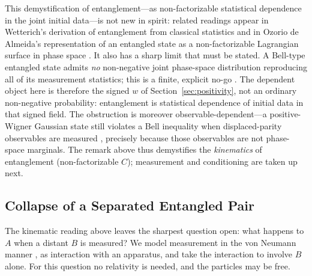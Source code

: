 \documentclass[12pt]{article}
\begin{document}
This demystification of entanglement---as non-factorizable statistical dependence in the joint initial data---is not new in spirit: related readings appear in Wetterich's derivation of entanglement from classical statistics \cite{wetterich2008} and in Ozorio de Almeida's representation of an entangled state as a non-factorizable Lagrangian surface in phase space \cite{ozorio2006}.  It also has a sharp limit that must be stated.  A Bell-type entangled state admits \emph{no} non-negative joint phase-space distribution reproducing all of its measurement statistics; this is a finite, explicit no-go \cite{blass2020,bell1964}.  The dependent object here is therefore the signed $w$ of Section~\ref{sec:positivity}, not an ordinary non-negative probability: entanglement is statistical dependence of initial data in that signed field.  The obstruction is moreover observable-dependent---a positive-Wigner Gaussian state still violates a Bell inequality when displaced-parity observables are measured \cite{banaszek1998}, precisely because those observables are not phase-space marginals.  The remark above thus demystifies the \emph{kinematics} of entanglement (non-factorizable $C$); measurement and conditioning are taken up next.

\subsection{Collapse of a Separated Entangled Pair}\label{sec:collapse}

The kinematic reading above leaves the sharpest question open: what happens to $A$ when a distant $B$ is measured?
We model measurement in the von Neumann manner \cite{vonneumann1932}, as interaction with an apparatus, and take the interaction to involve $B$ alone.
For this question no relativity is needed, and the particles may be free.
\end{document}

